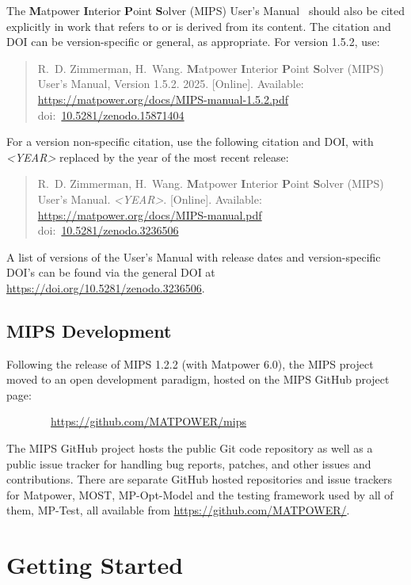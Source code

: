 \documentclass[12pt]{article}
\newcommand{\matpower}[0]{{\sc Matpower}}
\newcommand{\mptest}[0]{{MP-Test}}
\newcommand{\mips}[0]{{MIPS}}
\newcommand{\mipsurl}[0]{https://github.com/MATPOWER/mips}
\newcommand{\mipsname}[0]{{{\bf M}{\sc atpower} \textbf{I}nterior \textbf{P}oint \textbf{S}olver}}
\newcommand{\mpom}[0]{\mbox{MP-Opt-Model}}
\newcommand{\most}[0]{{MOST}}
\newcommand{\doi}[1]{doi:~\href{https://doi.org/#1}{#1}}
\numberwithin{equation}{section}
\numberwithin{table}{section}
\numberwithin{figure}{section}
\begin{document}
The \mipsname{} (\mips{}) User's Manual~\cite{mips_manual} should also be cited explicitly
in work that refers to or is derived from its content. The citation and
DOI can be version-specific or general, as appropriate. For version 1.5.2,
use:

\begin{quote}
\footnotesize
R.~D. Zimmerman, H.~Wang. \mipsname{} (\mips{}) User's Manual, Version 1.5.2. 2025. [Online]. Available: \url{https://matpower.org/docs/MIPS-manual-1.5.2.pdf}\\
\doi{10.5281/zenodo.15871404}
\end{quote}
For a version non-specific citation, use the following citation and DOI,
with \emph{\textless{}YEAR\textgreater{}} replaced by the year of the most recent release:

\begin{quote}
\footnotesize
R.~D. Zimmerman, H.~Wang. \mipsname{} (\mips{}) User's Manual. \emph{\textless{}YEAR\textgreater{}}.
[Online]. Available: \url{https://matpower.org/docs/MIPS-manual.pdf}\\
\doi{10.5281/zenodo.3236506}
\end{quote}
A list of versions of the User's Manual with release dates and
version-specific DOI's can be found via the general DOI at
\url{https://doi.org/10.5281/zenodo.3236506}.

\subsection{\mips{} Development}
\label{sec:development}

Following the release of \mips{} 1.2.2 (with \matpower{} 6.0), the \mips{} project moved to an open development paradigm, hosted on the \mips{} GitHub project page:

\bigskip

~~~~~~~~\url{\mipsurl}

\bigskip

The \mips{} GitHub project hosts the public Git code repository as well as a public issue tracker for handling bug reports, patches, and other issues and contributions. There are separate GitHub hosted repositories and issue trackers for \matpower{}, \most{}, \mpom{} and the testing framework used by all of them, \mptest{}, all available from \url{https://github.com/MATPOWER/}.


\section{Getting Started}
\end{document}
